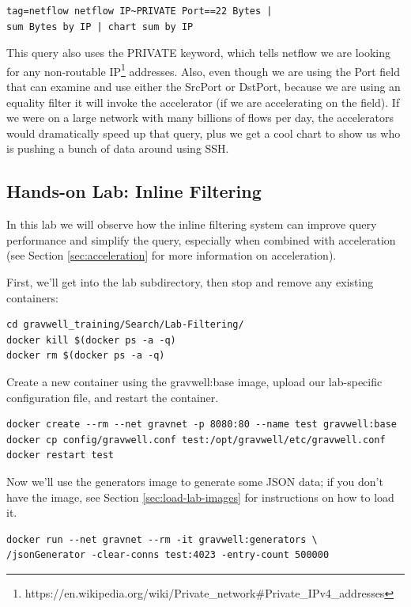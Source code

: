 \begin{Verbatim}[breaklines=true]
tag=netflow netflow IP~PRIVATE Port==22 Bytes |
sum Bytes by IP | chart sum by IP
\end{Verbatim}

This query also uses the PRIVATE keyword, which tells netflow we are
looking for any non-routable
IP\footnote{https://en.wikipedia.org/wiki/Private\_network\#Private\_IPv4\_addresses} addresses.
Also, even though we are using the Port field that can examine and use
either the SrcPort or DstPort, because we are using an equality filter
it will invoke the accelerator (if we are accelerating on the field).
If we were on a large network with many billions of flows per day, the
accelerators would dramatically speed up that query, plus we get a cool
chart to show us who is pushing a bunch of data around using SSH.

\clearpage
\subsection{Hands-on Lab: Inline Filtering}

In this lab we will observe how the inline
filtering system can improve query performance and simplify the query,
especially when combined with acceleration (see Section \ref{sec:acceleration} for more information
on acceleration).

First, we'll get into the lab subdirectory, then stop and remove any existing containers:

\begin{Verbatim}[breaklines=true]
cd gravwell_training/Search/Lab-Filtering/
docker kill $(docker ps -a -q)
docker rm $(docker ps -a -q)
\end{Verbatim}

Create a new container using the gravwell:base image, upload our lab-specific
configuration file, and restart the container.

\begin{Verbatim}[breaklines=true]
docker create --rm --net gravnet -p 8080:80 --name test gravwell:base
docker cp config/gravwell.conf test:/opt/gravwell/etc/gravwell.conf
docker restart test
\end{Verbatim}

Now we'll use the generators image to generate some JSON data; if you don't have the  image, see Section \ref{sec:load-lab-images} for instructions on how to load it.

\begin{Verbatim}[breaklines=true]
docker run --net gravnet --rm -it gravwell:generators \
/jsonGenerator -clear-conns test:4023 -entry-count 500000
\end{Verbatim}

